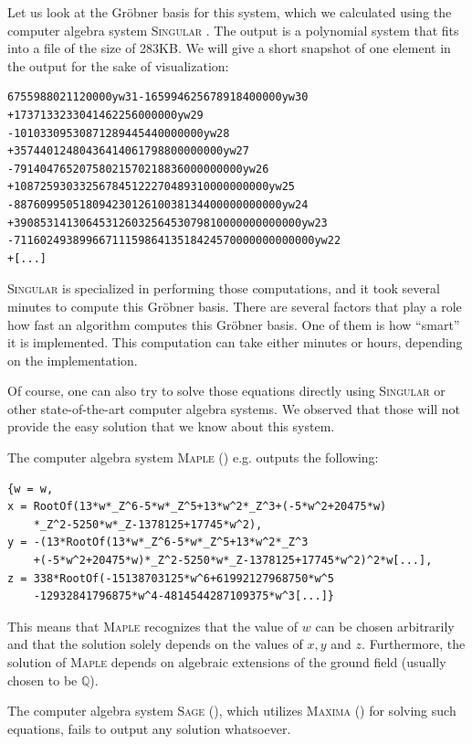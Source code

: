 \documentclass[oribibl]{llncs}
\newcommand{\QQ}{{\mathbb{Q}}}
\begin{document}
Let us look at the Gr\"obner basis for this system, which we
calculated using the computer algebra system \textsc{Singular}
\cite{Singular:2012}. The output is a polynomial system that fits into
a file of the size of 283KB. We will give a short snapshot of one
element in the output for the sake of visualization:

\begin{verbatim}
6755988021120000yw31-165994625678918400000yw30
+1737133233041462256000000yw29
-10103309530871289445440000000yw28
+35744012480436414061798800000000yw27
-79140476520758021570218836000000000yw26
+108725930332567845122270489310000000000yw25
-88760995051809423012610038134400000000000yw24
+39085314130645312603256453079810000000000000yw23
-7116024938996671115986413518424570000000000000yw22
+[...]
\end{verbatim}

\textsc{Singular} is specialized in performing those computations, and
it took several minutes to compute this Gr\"obner basis. There are
several factors that play a role how fast an algorithm computes this
Gr\"obner basis. One of them is how ``smart'' it is implemented. This
computation can take either minutes or hours, depending on the implementation.

Of course, one can also try to solve those equations directly using \textsc{Singular} or other 
state-of-the-art computer algebra systems. We observed that those will
not provide the easy solution that we know about this system.

The computer algebra system \textsc{Maple} (\cite{Maple}) e.g. outputs the following:
\begin{verbatim}
{w = w,
x = RootOf(13*w*_Z^6-5*w*_Z^5+13*w^2*_Z^3+(-5*w^2+20475*w)
    *_Z^2-5250*w*_Z-1378125+17745*w^2),
y = -(13*RootOf(13*w*_Z^6-5*w*_Z^5+13*w^2*_Z^3
    +(-5*w^2+20475*w)*_Z^2-5250*w*_Z-1378125+17745*w^2)^2*w[...],
z = 338*RootOf(-15138703125*w^6+61992127968750*w^5
    -12932841796875*w^4-4814544287109375*w^3[...]}
\end{verbatim}

This means that \textsc{Maple} recognizes that the value of $w$ can be
chosen arbitrarily and that the solution solely depends on the values
of $x,y$ and $z$. Furthermore, the solution of \textsc{Maple}
depends on algebraic extensions of the ground field (usually chosen to
be $\QQ$).

The computer algebra system \textsc{Sage} (\cite{sage}), which utilizes
\textsc{Maxima} (\cite{maxima}) for solving such equations, fails to
output any solution whatsoever.
\end{document}
